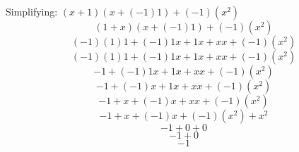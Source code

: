 \documentclass[10pt]{article}
\begin{document}
Simplifying: $(x + 1)(x + (-1)1) + (-1)(x^{2})$
$$(1 + x)(x + (-1)1) + (-1)(x^{2})$$
$$(-1)(1)1 + (-1)1x + 1x + xx + (-1)(x^{2})$$
$$(-1)(1)1 + (-1)1x + 1x + xx + (-1)(x^{2})$$
$$-1 + (-1)1x + 1x + xx + (-1)(x^{2})$$
$$-1 + (-1)x + 1x + xx + (-1)(x^{2})$$
$$-1 + x + (-1)x + xx + (-1)(x^{2})$$
$$-1 + x + (-1)x + (-1)(x^{2}) + x^{2}$$
$$-1 + 0 + 0$$
$$-1 + 0$$
$$-1$$
\end{document}
